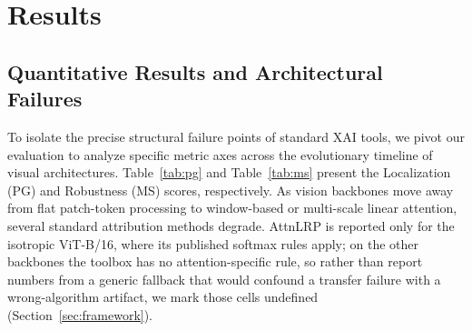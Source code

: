 \documentclass[final,5p,times,twocolumn]{elsarticle}
\begin{document}
\FloatBarrier
\section{Results}
\label{sec:results}



\subsection{Quantitative Results and Architectural Failures}
\label{sec:quant}
To isolate the precise structural failure points of standard XAI tools, we pivot our evaluation to analyze specific metric axes across the evolutionary timeline of visual architectures. Table~\ref{tab:pg} and Table~\ref{tab:ms} present the Localization (PG) and Robustness (MS) scores, respectively. As vision backbones move away from flat patch-token processing to window-based or multi-scale linear attention, several standard attribution methods degrade. AttnLRP is reported only for the isotropic ViT-B/16, where its published softmax rules apply; on the other backbones the toolbox has no attention-specific rule, so rather than report numbers from a generic fallback that would confound a transfer failure with a wrong-algorithm artifact, we mark those cells undefined (Section~\ref{sec:framework}).
\end{document}
